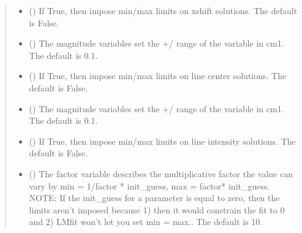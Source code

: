 \documentclass[letterpaper,10pt,english]{sphinxmanual}
\begin{document}
\begin{fulllineitems}
\begin{quote}
\begin{description}
\begin{itemize}
\item {} 
\sphinxAtStartPar
{} (\sphinxstyleliteralemphasis{\sphinxupquote{, }}) \textendash{} If True, then impose min/max limits on x\sphinxhyphen{}shift solutions. The default is False.

\item {} 
\sphinxAtStartPar
{} (\sphinxstyleliteralemphasis{\sphinxupquote{, }}) \textendash{} The magnitude variables set the +/\sphinxhyphen{} range of the variable in cm\sphinxhyphen{}1. The default is 0.1.

\item {} 
\sphinxAtStartPar
{} (\sphinxstyleliteralemphasis{\sphinxupquote{, }}) \textendash{} If True, then impose min/max limits on line center solutions. The default is False.

\item {} 
\sphinxAtStartPar
{} (\sphinxstyleliteralemphasis{\sphinxupquote{, }}) \textendash{} The magnitude variables set the +/\sphinxhyphen{} range of the variable in cm\sphinxhyphen{}1. The default is 0.1.

\item {} 
\sphinxAtStartPar
{} (\sphinxstyleliteralemphasis{\sphinxupquote{, }}) \textendash{} If True, then impose min/max limits on line intensity solutions. The default is False.

\item {} 
\sphinxAtStartPar
{} (\sphinxstyleliteralemphasis{\sphinxupquote{, }}) \textendash{} The factor variable describes the multiplicative factor the value can vary by min = 1/factor * init\_guess, max = factor* init\_guess. NOTE: If the init\_guess for a parameter is equal to zero, then the limits aren’t imposed because 1) then it would constrain the fit to 0 and 2) LMfit won’t let you set min = max.. The default is 10.


\end{itemize}
\end{description}
\end{quote}
\end{fulllineitems}
\end{document}
